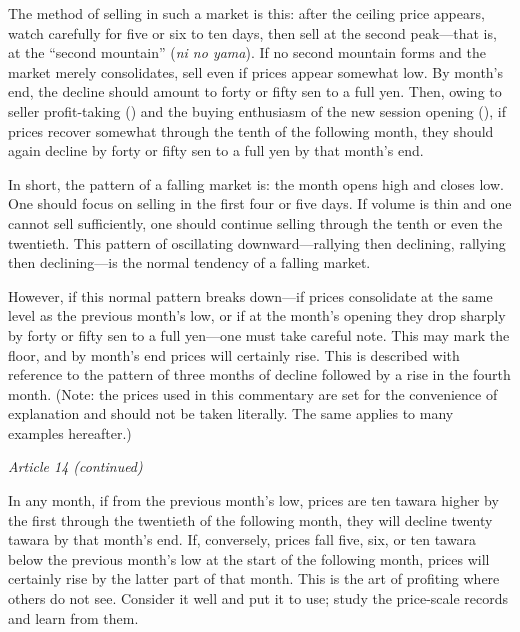 The method of selling in such a market is this: after the ceiling price
appears, watch carefully for five or six to ten days, then sell at the
second peak---that is, at the ``second mountain'' (\textit{ni no yama}).
If no second mountain forms and the market merely consolidates, sell even
if prices appear somewhat low. By month's end, the decline should amount
to forty or fifty sen to a full yen. Then, owing to seller profit-taking
() and the buying enthusiasm of the new session opening
(), if prices recover somewhat through the tenth of the
following month, they should again decline by forty or fifty sen to a
full yen by that month's end.

In short, the pattern of a falling market is: the month opens high and
closes low. One should focus on selling in the first four or five days.
If volume is thin and one cannot sell sufficiently, one should continue
selling through the tenth or even the twentieth. This pattern of
oscillating downward---rallying then declining, rallying then
declining---is the normal tendency of a falling market.

However, if this normal pattern breaks down---if prices consolidate at
the same level as the previous month's low, or if at the month's opening
they drop sharply by forty or fifty sen to a full yen---one must take
careful note. This may mark the floor, and by month's end prices will
certainly rise. This is described with reference to the pattern of three
months of decline followed by a rise in the fourth month. (Note: the
prices used in this commentary are set for the convenience of explanation
and should not be taken literally. The same applies to many examples
hereafter.)

\begin{sokyubox}
{\small\itshape\color{sokyubar} Article 14 (continued)}

\medskip
In any month, if from the previous month's low, prices are ten tawara
higher by the first through the twentieth of the following month, they
will decline twenty tawara by that month's end. If, conversely, prices
fall five, six, or ten tawara below the previous month's low at the
start of the following month, prices will certainly rise by the latter
part of that month. This is the art of profiting where others do not
see. Consider it well and put it to use; study the price-scale records
and learn from them.
\end{sokyubox}

